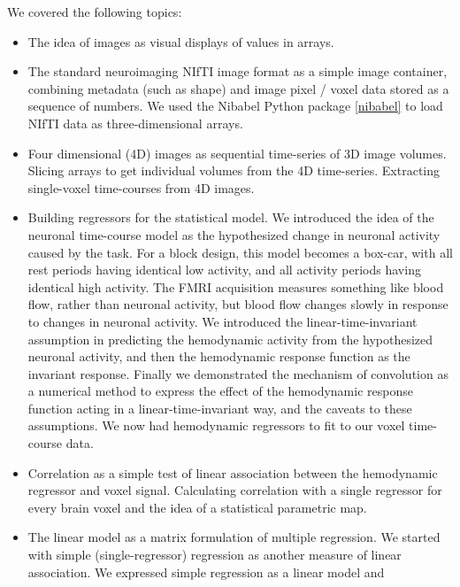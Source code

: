 We covered the following topics:

\begin{itemize}

\item
    The idea of images as visual displays of values in arrays.
\item
    The standard neuroimaging NIfTI image format as a simple image container,
        combining metadata (such as shape) and image pixel / voxel data stored
        as a sequence of numbers.  We used the Nibabel Python package
        \cref{nibabel} to load NIfTI data as three-dimensional arrays.
\item
    Four dimensional (4D) images as sequential time-series of 3D image
        volumes.  Slicing arrays to get individual volumes from the 4D
        time-series.  Extracting single-voxel time-courses from 4D images.
\item
    Building regressors for the statistical model.  We introduced the idea of
        the neuronal time-course model as the hypothesized change in neuronal
        activity caused by the task.  For a block design, this model becomes a
        box-car, with all rest periods having identical low activity, and all
        activity periods having identical high activity.  The FMRI acquisition
        measures something like blood flow, rather than neuronal activity, but
        blood flow changes slowly in response to changes in neuronal activity.
        We introduced the linear-time-invariant assumption in predicting the
        hemodynamic activity from the hypothesized neuronal activity, and then
        the hemodynamic response function as the invariant response.  Finally
        we demonstrated the mechanism of convolution as a numerical method to
        express the effect of the hemodynamic response function acting in a
        linear-time-invariant way, and the caveats to these assumptions.  We
        now had hemodynamic regressors to fit to our voxel time-course data.
\item
    Correlation as a simple test of linear association between the hemodynamic
        regressor and voxel signal.  Calculating correlation with a single
        regressor for every brain voxel and the idea of a statistical
        parametric map.
\item
    The linear model as a matrix formulation of multiple regression.  We started with
        simple (single-regressor) regression as another measure of linear
        association.  We expressed simple regression as a linear model and

\end{itemize}
